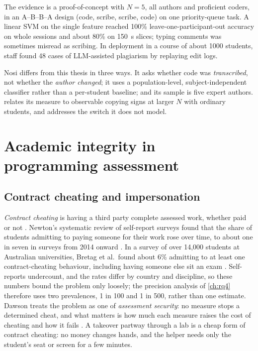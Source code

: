 The evidence is a proof-of-concept with $N = 5$, all authors and proficient
coders, in an A--B--B--A design (code, scribe, scribe, code) on one
priority-queue task. A linear SVM on the single feature reached 100\%
leave-one-participant-out accuracy on whole sessions and about 80\% on
\SI{150}{\second} slices; typing comments was sometimes misread as
scribing. In deployment in a course of about 1000 students, staff found 48
cases of LLM-assisted plagiarism by replaying edit logs.

Nosi differs from this thesis in three ways. It asks whether code was
\emph{transcribed}, not whether the \emph{author changed}; it uses a
population-level, subject-independent classifier rather than a per-student
baseline; and its sample is five expert authors.  relates its measure
to observable copying signs at larger $N$ with ordinary students, and 
addresses the switch it does not model.

\section{Academic integrity in programming assessment}
\label{sec:rw-integrity}

\subsection{Contract cheating and impersonation}
\emph{Contract cheating} is having a third party complete assessed work,
whether paid or not \cite{lancaster2016contract}. Newton's systematic review
of self-report surveys found that the share of students admitting to paying
someone for their work rose over time, to about one in seven in surveys from
2014 onward \cite{newton2018contract}. In a survey of over 14,000 students at
Australian universities, Bretag et al.\ found about 6\% admitting to at least
one contract-cheating behaviour, including having someone else sit an exam
\cite{bretag2019contract}. Self-reports undercount, and the rates differ by
country and discipline, so these numbers bound the problem only loosely; the
precision analysis of \cref{ch:rq4} therefore uses two prevalences, 1 in 100
and 1 in 500, rather than one estimate. Dawson treats the problem as one of
\emph{assessment security}: no measure stops a determined cheat, and what
matters is how much each measure raises the cost of cheating and how it fails
\cite{dawson2020defending}. A takeover partway through a lab is a cheap form
of contract cheating: no money changes hands, and the helper needs only the
student's seat or screen for a few minutes.

